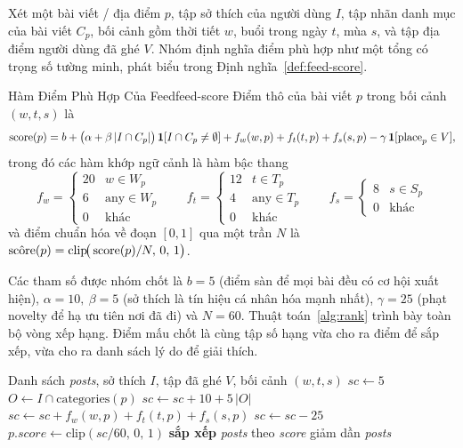 Xét một bài viết / địa điểm $p$, tập sở thích của người dùng $I$, tập
nhãn danh mục của bài viết $C_p$, bối cảnh gồm thời tiết $w$, buổi trong
ngày $t$, mùa $s$, và tập địa điểm người dùng đã ghé $V$. Nhóm định nghĩa
điểm phù hợp như một tổng có trọng số tường minh, phát biểu trong
Định nghĩa~\ref{def:feed-score}.

\begin{mydef}{Hàm Điểm Phù Hợp Của Feed}{feed-score}
Điểm thô của bài viết $p$ trong bối cảnh $(w,t,s)$ là
\[
\operatorname{score}(p) = b
+ \big(\alpha + \beta\,|I \cap C_p|\big)\,\mathbf{1}[I \cap C_p \neq \emptyset]
+ f_w(w,p) + f_t(t,p) + f_s(s,p)
- \gamma\,\mathbf{1}[\operatorname{place}_p \in V],
\]
trong đó các hàm khớp ngữ cảnh là hàm bậc thang
\[
f_w =
\begin{cases}
20 & w \in W_p \\
6  & \text{any} \in W_p \\
0  & \text{khác}
\end{cases}
\qquad
f_t =
\begin{cases}
12 & t \in T_p \\
4  & \text{any} \in T_p \\
0  & \text{khác}
\end{cases}
\qquad
f_s =
\begin{cases}
8 & s \in S_p \\
0 & \text{khác}
\end{cases}
\]
và điểm chuẩn hóa về đoạn $[0,1]$ qua một trần $N$ là
$\hat{\operatorname{score}}(p) = \mathrm{clip}\!\big(\operatorname{score}(p)/N,\, 0,\, 1\big)$.
\end{mydef}

Các tham số được nhóm chốt là $b=5$ (điểm sàn để mọi bài đều có cơ hội
xuất hiện), $\alpha=10,\ \beta=5$ (sở thích là tín hiệu cá nhân hóa mạnh
nhất), $\gamma=25$ (phạt novelty để hạ ưu tiên nơi đã đi) và $N=60$.
Thuật toán~\ref{alg:rank} trình bày toàn bộ vòng xếp hạng. Điểm mấu chốt
là cùng tập số hạng vừa cho ra điểm để sắp xếp, vừa cho ra danh sách lý
do để giải thích.

\begin{algorithm}[H]
\caption{Xếp hạng feed theo ngữ cảnh (weighted additive)}
\label{alg:rank}
\begin{algorithmic}[1]
\Require Danh sách \textit{posts}, sở thích $I$, tập đã ghé $V$, bối cảnh $(w,t,s)$
    \State $sc \gets 5$ 
    \State $O \gets I \cap \mathrm{categories}(p)$
        \State $sc \gets sc + 10 + 5\,|O|$ 
    \EndIf
    \State $sc \gets sc + f_w(w,p) + f_t(t,p) + f_s(s,p)$
        \State $sc \gets sc - 25$ 
    \EndIf
    \State $p.\textit{score} \gets \mathrm{clip}(sc/60,\,0,\,1)$
\EndFor
\State \textbf{sắp xếp} \textit{posts} theo \textit{score} giảm dần
\State \Return \textit{posts}
\end{algorithmic}
\end{algorithm}

